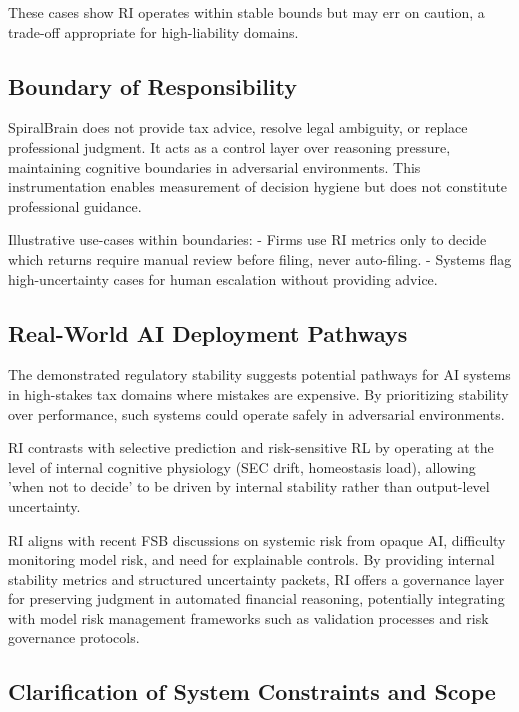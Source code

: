 \documentclass[12pt,a4paper]{article}
\begin{document}
These cases show RI operates within stable bounds but may err on caution, a trade-off appropriate for high-liability domains.

\subsection{Boundary of Responsibility}

SpiralBrain does not provide tax advice, resolve legal ambiguity, or replace professional judgment. It acts as a control layer over reasoning pressure, maintaining cognitive boundaries in adversarial environments. This instrumentation enables measurement of decision hygiene but does not constitute professional guidance.

Illustrative use-cases within boundaries:
- Firms use RI metrics only to decide which returns require manual review before filing, never auto-filing.
- Systems flag high-uncertainty cases for human escalation without providing advice.

\subsection{Real-World AI Deployment Pathways}

The demonstrated regulatory stability suggests potential pathways for AI systems in high-stakes tax domains where mistakes are expensive. By prioritizing stability over performance, such systems could operate safely in adversarial environments.

RI contrasts with selective prediction \cite{geifman2017selective} and risk-sensitive RL by operating at the level of internal cognitive physiology (SEC drift, homeostasis load), allowing 'when not to decide' to be driven by internal stability rather than output-level uncertainty.

RI aligns with recent FSB discussions \cite{fsb2023ai} on systemic risk from opaque AI, difficulty monitoring model risk, and need for explainable controls. By providing internal stability metrics and structured uncertainty packets, RI offers a governance layer for preserving judgment in automated financial reasoning, potentially integrating with model risk management frameworks such as validation processes and risk governance protocols.

\subsection{Clarification of System Constraints and Scope}
\end{document}
